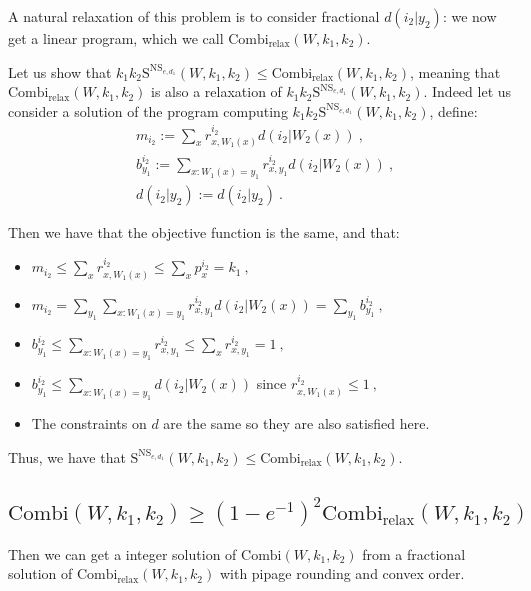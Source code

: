\documentclass[11pt]{article}
\theoremstyle{definition}
\theoremstyle{remark}
\begin{document}
A natural relaxation of this problem is to consider fractional $d(i_2|y_2)$: we now get a linear program, which we call $\textrm{Combi}_{\text{relax}}(W,k_1,k_2)$.

Let us show that $k_1k_2\mathrm{S}^{\mathrm{NS}_{e,d_1}}(W,k_1,k_2) \leq \textrm{Combi}_{\text{relax}}(W,k_1,k_2)$, meaning that  $\textrm{Combi}_{\text{relax}}(W,k_1,k_2)$ is also a relaxation of $k_1k_2\mathrm{S}^{\mathrm{NS}_{e,d_1}}(W,k_1,k_2)$. Indeed let us consider a solution of the program computing $k_1k_2\mathrm{S}^{\mathrm{NS}_{e,d_1}}(W,k_1,k_2)$, define:
\begin{equation}
  \begin{aligned}
    &m_{i_2} := \sum_x r^{i_2}_{x,W_1(x)}d(i_2|W_2(x)) \ ,\\
    &b^{i_2}_{y_1} := \sum_{x:W_1(x)=y_1} r^{i_2}_{x,y_1}d(i_2|W_2(x)) \ ,\\
    &d(i_2|y_2) := d(i_2|y_2) \ .
  \end{aligned}
\end{equation}

Then we have that the objective function is the same, and that:
\begin{itemize}
\item $m_{i_2} \leq \sum_x r^{i_2}_{x,W_1(x)} \leq  \sum_x p^{i_2}_x = k_1 \ ,$
\item $m_{i_2} = \sum_{y_1} \sum_{x:W_1(x)=y_1} r^{i_2}_{x,y_1}d(i_2|W_2(x)) = \sum_{y_1} b^{i_2}_{y_1} \ ,$
\item $b^{i_2}_{y_1} \leq \sum_{x:W_1(x)=y_1} r^{i_2}_{x,y_1} \leq \sum_x r^{i_2}_{x,y_1} = 1 \ ,$
\item $b^{i_2}_{y_1} \leq \sum_{x:W_1(x)=y_1} d(i_2|W_2(x))$ since $r^{i_2}_{x,W_1(x)} \leq 1\ ,$
\item The constraints on $d$ are the same so they are also satisfied here.
\end{itemize}

Thus, we have that $\mathrm{S}^{\mathrm{NS}_{e,d_1}}(W,k_1,k_2) \leq \textrm{Combi}_{\text{relax}}(W,k_1,k_2)$.

\subsection{$\textrm{Combi}(W,k_1,k_2) \geq (1-e^{-1})^2\textrm{Combi}_{\text{relax}}(W,k_1,k_2)$}
Then we can get a integer solution of $\textrm{Combi}(W,k_1,k_2)$ from a fractional solution of $\textrm{Combi}_{\text{relax}}(W,k_1,k_2)$ with pipage rounding and convex order.
\end{document}
